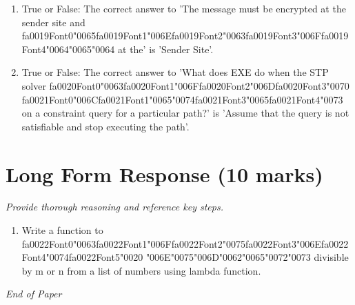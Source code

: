 \documentclass[12pt]{article}
\begin{document}
\begin{enumerate}[label=\arabic*.]
\item True or False: The correct answer to 'The message must be encrypted at the sender site and {\csname fa0019Font0\endcsname\char"0065}{\csname fa0019Font1\endcsname\char"006E}{\csname fa0019Font2\endcsname\char"0063}{\csname fa0019Font3\endcsname\char"006F}{\csname fa0019Font4\endcsname\char"0064}{\char"0065}{\char"0064} at the' is 'Sender Site'.
\item True or False: The correct answer to 'What does EXE do when the STP solver {\csname fa0020Font0\endcsname\char"0063}{\csname fa0020Font1\endcsname\char"006F}{\csname fa0020Font2\endcsname\char"006D}{\csname fa0020Font3\endcsname\char"0070} {\csname fa0021Font0\endcsname\char"006C}{\csname fa0021Font1\endcsname\char"0065}{\char"0074}{\csname fa0021Font3\endcsname\char"0065}{\csname fa0021Font4\endcsname\char"0073} on a constraint query for a particular path?' is 'Assume that the query is not satisfiable and stop executing the path'.
\end{enumerate}

\section*{Long Form Response (10 marks)}
\textit{Provide thorough reasoning and reference key steps.}
\begin{enumerate}[label=\arabic*.]
\item Write a function to {\csname fa0022Font0\endcsname\char"0063}{\csname fa0022Font1\endcsname\char"006F}{\csname fa0022Font2\endcsname\char"0075}{\csname fa0022Font3\endcsname\char"006E}{\csname fa0022Font4\endcsname\char"0074}{\csname fa0022Font5\endcsname\char"0020} {\char"006E}{\char"0075}{\char"006D}{\char"0062}{\char"0065}{\char"0072}{\char"0073} divisible by m or n from a list of numbers using lambda
function.
\end{enumerate}

\vfill
\noindent\textit{End of Paper}
\end{document}
